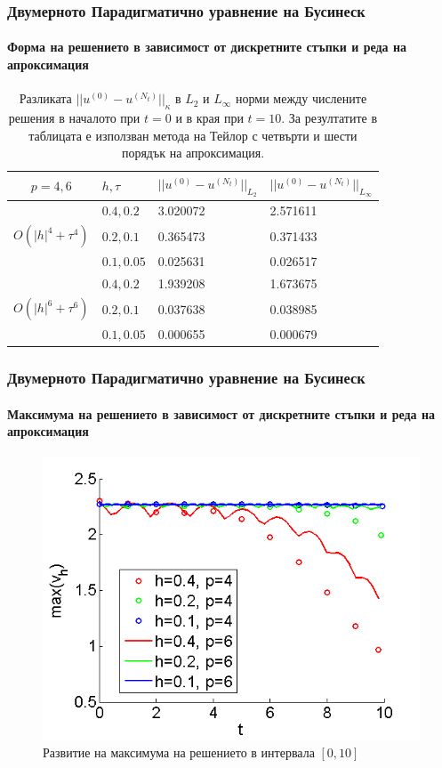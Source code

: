 \documentclass{beamer}
\begin{document}
\begin{frame}
\frametitle{Двумерното Парадигматично уравнение на Бусинеск}
\framesubtitle{Форма на решението в зависимост от дискретните стъпки и реда на апроксимация}

\begin{table}[ht]
\centering
\small
		\begin{tabular}{||c|l|l|l||}
			\hline
			\hline
  $p=4,6$   &  $h, \tau$ &  $||u^{(0)} - u^{(N_t)}||_{L_2}$  & $||u^{(0)} - u^{(N_t)}||_{L_\infty}$   \\
   		      \hline 
			\hline
           				& $0.4, 0.2$   &  3.020072 & 2.571611     \\
			\hline 
  $O(|h|^4+\tau^4)$ & $0.2, 0.1$   & 0.365473 & 0.371433      \\
			\hline 
           				& $0.1, 0.05$ & 0.025631 & 0.026517      \\
	   \hline
          \hline
           				& $0.4, 0.2$   & 1.939208 & 1.673675      \\
			\hline
  $O(|h|^6+\tau^6)$ & $0.2, 0.1$   & 0.037638 & 0.038985      \\
    \hline
           				& $0.1, 0.05$  & 0.000655 & 0.000679       \\
	   \hline
		\hline 
		\end{tabular}
		\caption{Разликата $||u^{(0)} - u^{(N_t)}||_\kappa$ в $L_2$ и $L_\infty$ норми между числените решения в началото при $t=0$ и в края при $t=10$. За резултатите в таблицата е използван метода на Тейлор с четвърти и шести порядък на апроксимация. }
\label{tableK}
\end{table}

\end{frame}

\begin{frame}
\frametitle{Двумерното Парадигматично уравнение на Бусинеск}
\framesubtitle{Максимума на решението в зависимост от дискретните стъпки и реда на апроксимация}
\begin{figure}
	\includegraphics[width=0.65\linewidth]{Maximum_TaylorZeroBnd_50x50_bt3_c030.png}
\caption{Развитие на максимума на решението в интервала $[0, 10]$}

\end{figure}

\end{frame}
\end{document}
